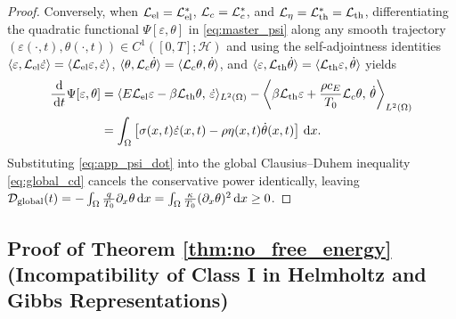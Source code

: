 \begin{proof}
Conversely, when $\mathcal{L}_{\mathrm{el}} = \mathcal{L}_{\mathrm{el}}^*$, $\mathcal{L}_c = \mathcal{L}_c^*$, and $\mathcal{L}_\eta = \mathcal{L}_{\mathrm{th}}^* = \mathcal{L}_{\mathrm{th}}$, differentiating the quadratic functional $\Psi[\varepsilon,\theta]$ in \eqref{eq:master_psi} along any smooth trajectory $(\varepsilon(\cdot,t),\theta(\cdot,t)) \in C^1([0,T];\mathcal{H})$ and using the self-adjointness identities $\langle\varepsilon,\mathcal{L}_{\mathrm{el}}\dot{\varepsilon}\rangle = \langle\mathcal{L}_{\mathrm{el}}\varepsilon,\dot{\varepsilon}\rangle$, $\langle\theta,\mathcal{L}_c\dot{\theta}\rangle = \langle\mathcal{L}_c\theta,\dot{\theta}\rangle$, and $\langle\varepsilon,\mathcal{L}_{\mathrm{th}}\dot{\theta}\rangle = \langle\mathcal{L}_{\mathrm{th}}\varepsilon,\dot{\theta}\rangle$ yields
\begin{align}
  \frac{\,\mathrm{d}}{\,\mathrm{d} t}\Psi[\varepsilon,\theta] &= \langle E\mathcal{L}_{\mathrm{el}}\varepsilon - \beta\mathcal{L}_{\mathrm{th}}\theta,\,\dot{\varepsilon}\rangle_{L^2(\Omega)} - \left\langle\beta\mathcal{L}_{\mathrm{th}}\varepsilon + \frac{\rho c_E}{T_0}\mathcal{L}_c\theta,\,\dot{\theta}\right\rangle_{L^2(\Omega)} \nonumber\\
  &= \int_\Omega \left[\sigma(x,t)\dot{\varepsilon}(x,t) - \rho\eta(x,t)\dot{\theta}(x,t)\right]\,\mathrm{d} x. \label{eq:app_psi_dot}
\end{align}
Substituting \eqref{eq:app_psi_dot} into the global Clausius--Duhem inequality \eqref{eq:global_cd} cancels the conservative power identically, leaving $\mathcal{D}_{\mathrm{global}}(t) = -\int_\Omega \frac{q}{T_0}\partial_x\theta\,\mathrm{d} x = \int_\Omega \frac{\kappa}{T_0}(\partial_x\theta)^2\,\mathrm{d} x \ge 0$.
\end{proof}

\subsection{Proof of Theorem \ref{thm:no_free_energy} (Incompatibility of Class I in Helmholtz and Gibbs Representations)}\label{app:proof_thm1}

